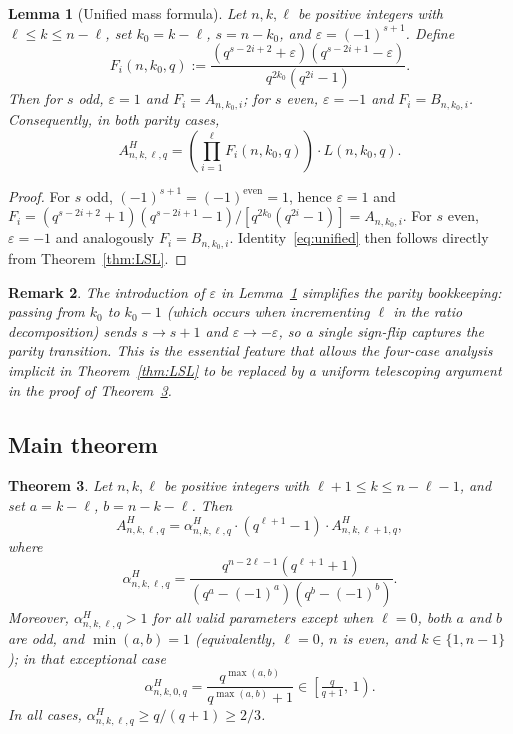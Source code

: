 \documentclass[10pt,a4paper]{amsart}
\newtheorem{theorem}{Theorem}
\newtheorem{lemma}[theorem]{Lemma}
\newtheorem{remark}[theorem]{Remark}
\begin{document}
\begin{lemma}[Unified mass formula]\label{lem:unified}
Let $n, k, \ell$ be positive integers with $\ell \leq k \leq n - \ell$, set
$k_0 = k - \ell$, $s = n - k_0$, and $\varepsilon = (-1)^{s+1}$. Define
\begin{equation}\label{eq:Fi}
  F_i(n, k_0, q) := \frac{(q^{s-2i+2} + \varepsilon)(q^{s-2i+1} - \varepsilon)}{q^{2k_0}(q^{2i}-1)}.
\end{equation}
Then for $s$ odd, $\varepsilon = 1$ and $F_i = A_{n,k_0,i}$; for $s$ even,
$\varepsilon = -1$ and $F_i = B_{n,k_0,i}$. Consequently, in both parity cases,
\begin{equation}\label{eq:unified}
  A^H_{n,k,\ell,q} = \left(\prod_{i=1}^{\ell} F_i(n,k_0,q)\right) \cdot L(n,k_0,q).
\end{equation}
\end{lemma}

\begin{proof}
For $s$ odd, $(-1)^{s+1} = (-1)^{\text{even}} = 1$, hence $\varepsilon = 1$ and
$F_i = (q^{s-2i+2}+1)(q^{s-2i+1}-1)/[q^{2k_0}(q^{2i}-1)] = A_{n,k_0,i}$.
For $s$ even, $\varepsilon = -1$ and analogously $F_i = B_{n,k_0,i}$.
Identity~\eqref{eq:unified} then follows directly from Theorem~\ref{thm:LSL}.
\end{proof}

\begin{remark}
The introduction of $\varepsilon$ in Lemma~\ref{lem:unified} simplifies the
parity bookkeeping: passing from $k_0$ to $k_0 - 1$ (which occurs when
incrementing $\ell$ in the ratio decomposition) sends $s \to s+1$ and
$\varepsilon \to -\varepsilon$, so a single sign-flip captures the parity
transition. This is the essential feature that allows the four-case analysis
implicit in Theorem~\ref{thm:LSL} to be replaced by a uniform telescoping
argument in the proof of Theorem~\ref{thm:main}.
\end{remark}

\subsection{Main theorem}\label{sec:Hmain}


\begin{theorem}\label{thm:main}
Let $n, k, \ell$ be positive integers with $\ell+1 \leq k \leq n-\ell-1$,
and set $a = k - \ell$, $b = n-k-\ell$. Then
\begin{equation}\label{eq:decomp}
  A^H_{n,k,\ell,q} = \alpha^H_{n,k,\ell,q}\cdot (q^{\ell+1}-1)\cdot A^H_{n,k,\ell+1,q},
\end{equation}
where
\begin{equation}\label{eq:alpha}
  \alpha^H_{n,k,\ell,q} = \frac{q^{n-2\ell-1}(q^{\ell+1}+1)}{(q^{a}-(-1)^{a})(q^{b}-(-1)^{b})}.
\end{equation}
Moreover, $\alpha^H_{n,k,\ell,q} > 1$ for all valid parameters \emph{except}
when $\ell = 0$, both $a$ and $b$ are odd, and $\min(a,b) = 1$
(equivalently, $\ell=0$, $n$ is even, and $k\in\{1, n-1\}$); in that exceptional case
\[
  \alpha^H_{n,k,0,q} = \frac{q^{\max(a,b)}}{q^{\max(a,b)}+1} \in \left[\tfrac{q}{q+1},\, 1\right).
\]
In all cases, $\alpha^H_{n,k,\ell,q} \geq q/(q+1) \geq 2/3$.
\end{theorem}
\end{document}
